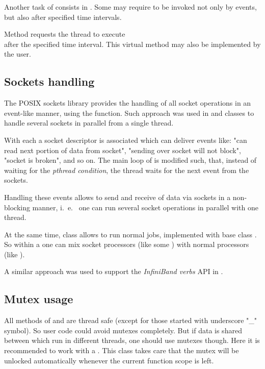 Another task of  consists in . 
Some  
may require to be invoked not only by events, but also after specified time intervals.

Method  
requests the thread to execute \\ 
after the specified time interval. This virtual method may also be implemented
by the user.  
 

\subsection{Sockets handling}
\label{prog_services_threads_sockets}
The POSIX sockets library provides the  handling of all socket operations in 
an event-like manner, using the  function. Such approach was used in  
 and  classes to 
handle several sockets in parallel from a single thread.

With each  a socket descriptor is associated which can
deliver events like: "can read next portion of data from socket", 
"sending over socket will not block", "socket is broken", and so on.
The main loop of  is modified such, that,
instead of waiting for the {\em pthread condition}, 
the thread waits for the next event from the sockets.

Handling these events allows to send and receive of data via sockets 
in a non-blocking manner, i.~e.~ one can run several socket 
operations in parallel with one thread.

At the same time,  class allows to run normal jobs,
implemented with base class . 
So within a  one can mix socket processors (like 
some ) with normal processors (like ).  

A similar approach was used to support the {\em InfiniBand verbs} API in \dabc. 


\subsection{Mutex usage}
\label{prog_services_threads_mutex}
All methods of  and  are thread
safe (except for those started with underscore "\_" symbol). 
So user code could avoid mutexes completely. But if data is shared between
 which run in different threads, one should use mutexes though. 
Here it is recommended to work with a
. This class takes care that the mutex will be unlocked
automatically whenever the current function scope is left. 

